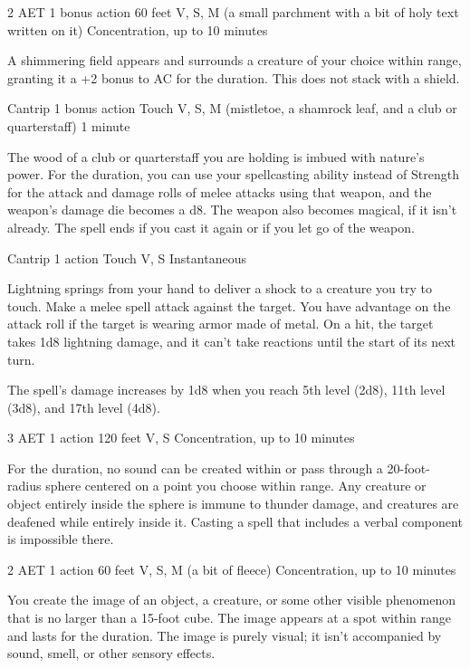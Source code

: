 {2 AET}
{1 bonus action}
{60 feet}
{V, S, M (a small parchment with a bit of holy text written on it)}
{Concentration, up to 10 minutes}

A shimmering field appears and surrounds a creature of your choice within range, granting it a +2 bonus to AC for the duration. This does not stack with a shield.


{Cantrip}
{1 bonus action}
{Touch}
{V, S, M (mistletoe, a shamrock leaf, and a club or quarterstaff)}
{1 minute}

The wood of a club or quarterstaff you are holding is imbued with nature's power. For the duration, you can use your spellcasting ability instead of Strength for the attack and damage rolls of melee attacks using that weapon, and the weapon's damage die becomes a d8. The weapon also becomes magical, if it isn't already. The spell ends if you cast it again or if you let go of the weapon.


{Cantrip}
{1 action}
{Touch}
{V, S}
{Instantaneous}

Lightning springs from your hand to deliver a shock to a creature you try to touch. Make a melee spell attack against the target. You have advantage on the attack roll if the target is wearing armor made of metal. On a hit, the target takes 1d8 lightning damage, and it can't take reactions until the start of its next turn.

The spell's damage increases by 1d8 when you reach 5th level (2d8), 11th level (3d8), and 17th level (4d8).


{3 AET}
{1 action}
{120 feet}
{V, S}
{Concentration, up to 10 minutes}

For the duration, no sound can be created within or pass through a 20-foot-radius sphere centered on a point you choose within range. Any creature or object entirely inside the sphere is immune to thunder damage, and creatures are deafened while entirely inside it. Casting a spell that includes a verbal component is impossible there.


{2 AET}
{1 action}
{60 feet}
{V, S, M (a bit of fleece)}
{Concentration, up to 10 minutes}

You create the image of an object, a creature, or some other visible phenomenon that is no larger than a 15-foot cube. The image appears at a spot within range and lasts for the duration. The image is purely visual; it isn't accompanied by sound, smell, or other sensory effects.

